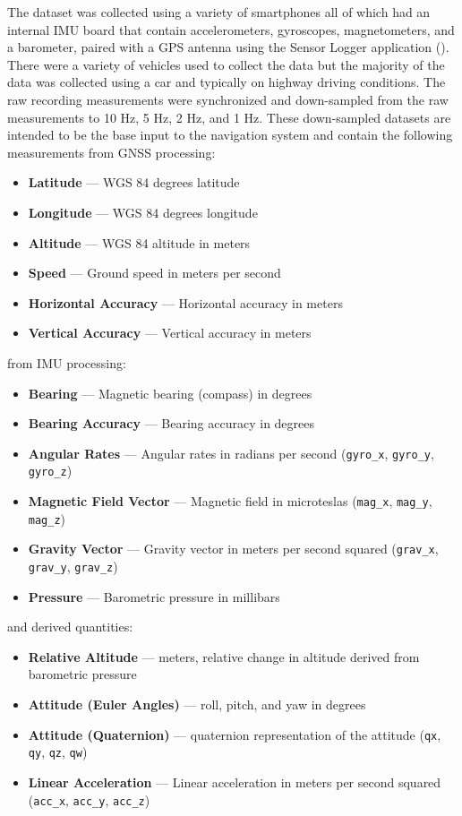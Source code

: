 \documentclass[sageh,times]{sagej}
\begin{document}
The dataset was collected using a variety of smartphones all of which had an internal IMU board that contain accelerometers, gyroscopes, magnetometers, and a barometer, paired with a GPS antenna using the Sensor Logger application (\cite{awesome-sensor-logger}). There were a variety of vehicles used to collect the data but the majority of the data was collected using a car and typically on highway driving conditions. The raw recording measurements were synchronized and down-sampled from the raw measurements to 10 Hz, 5 Hz, 2 Hz, and 1 Hz. These down-sampled datasets are intended to be the base input to the navigation system and contain the following measurements from GNSS processing:\begin{itemize}
  \item \textbf{Latitude} --- WGS 84 degrees latitude
  \item \textbf{Longitude} --- WGS 84 degrees longitude 
  \item \textbf{Altitude} --- WGS 84 altitude in meters
  \item \textbf{Speed} --- Ground speed in meters per second
  \item \textbf{Horizontal Accuracy} --- Horizontal accuracy in meters
  \item \textbf{Vertical Accuracy} --- Vertical accuracy in meters
\end{itemize} from IMU processing: \begin{itemize}
  \item \textbf{Bearing} --- Magnetic bearing (compass) in degrees
  \item \textbf{Bearing Accuracy} --- Bearing accuracy in degrees
  \item \textbf{Angular Rates} --- Angular rates in radians per second (\verb|gyro_x|, \verb|gyro_y|, \verb|gyro_z|)
  \item \textbf{Magnetic Field Vector} --- Magnetic field in microteslas (\verb|mag_x|, \verb|mag_y|, \verb|mag_z|)
  \item \textbf{Gravity Vector} --- Gravity vector in meters per second squared (\verb|grav_x|, \verb|grav_y|, \verb|grav_z|)
  \item \textbf{Pressure} --- Barometric pressure in millibars
\end{itemize} and derived quantities:\begin{itemize}
  \item \textbf{Relative Altitude} --- meters, relative change in altitude derived from barometric pressure
  \item \textbf{Attitude (Euler Angles)} --- roll, pitch, and yaw in degrees
  \item \textbf{Attitude (Quaternion)} --- quaternion representation of the attitude (\verb|qx|, \verb|qy|, \verb|qz|, \verb|qw|)
  \item \textbf{Linear Acceleration} --- Linear acceleration in meters per second squared (\verb|acc_x|, \verb|acc_y|, \verb|acc_z|)
\end{itemize}
\end{document}
